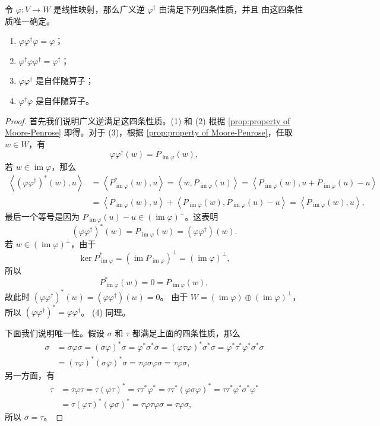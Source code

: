 \documentclass[fontset=none,zihao=-4]{Notes}
\DeclareMathOperator\im{im}
\newcommand{\inn}[1]{\left\langle#1\right\rangle}
\begin{document}
\begin{theorem}[广义逆的刻画]\label{thm:character of Moore-Penrose}
  令 $\varphi:V\to W$ 是线性映射，那么广义逆 $\varphi^\dagger$ 由满足下列四条性质，并且
  由这四条性质唯一确定。
  \begin{enumerate}
    \item $\varphi\varphi^\dagger\varphi=\varphi$；
    \item $\varphi^\dagger\varphi\varphi^\dagger=\varphi^\dagger$；
    \item $\varphi\varphi^\dagger$ 是自伴随算子；
    \item $\varphi^\dagger\varphi$ 是自伴随算子。
  \end{enumerate}
\end{theorem}
\begin{proof}
  首先我们说明广义逆满足这四条性质。(1) 和 (2) 根据 \autoref{prop:property of Moore-Penrose}
  即得。对于 (3)，根据 \autoref{prop:property of Moore-Penrose}，任取 $w\in W$，有
  \[
    \varphi\varphi^\dagger(w)=P_{\im\varphi}(w),  
  \]
  若 $w\in\im\varphi$，那么
  \begin{align*}
    \inn{(\varphi\varphi^\dagger)^*(w),u}&=\inn{P_{\im\varphi}^*(w),u}=\inn{w,P_{\im\varphi}(u)}
    =\inn{P_{\im\varphi}(w),u+P_{\im\varphi}(u)-u}\\
    &=\inn{P_{\im\varphi}(w),u}+\inn{P_{\im\varphi}(w),P_{\im\varphi}(u)-u}
    =\inn{P_{\im\varphi}(w),u},
  \end{align*}
  最后一个等号是因为 $P_{\im\varphi}(u)-u\in(\im\varphi)^\bot$。这表明
  \[
    (\varphi\varphi^\dagger)^*(w)=P_{\im\varphi}(w)=(\varphi\varphi^\dagger)(w).
  \]
  若 $w\in(\im\varphi)^\bot$，由于
  \[
    \ker P_{\im\varphi}^*=(\im P_{\im\varphi})^\bot=(\im\varphi)^\bot,  
  \]
  所以
  \[
    P_{\im\varphi}^*(w)=0=P_{\im\varphi}(w),  
  \]
  故此时 $(\varphi\varphi^\dagger)^*(w)=(\varphi\varphi^\dagger)(w)=0$。
  由于 $W=(\im\varphi)\oplus(\im\varphi)^\bot$，所以 $(\varphi\varphi^\dagger)^*=\varphi\varphi^\dagger$。
  (4) 同理。

  下面我们说明唯一性。假设 $\sigma$ 和 $\tau$ 都满足上面的四条性质，那么
  \begin{align*}
    \sigma&=\sigma\varphi\sigma=(\sigma\varphi)^*\sigma=\varphi^*\sigma^*\sigma
    =(\varphi\tau\varphi)^*\sigma^*\sigma=\varphi^*\tau^*\varphi^*\sigma^*\sigma\\
    &=(\tau\varphi)^*(\sigma\varphi)^*\sigma=\tau\varphi\sigma\varphi\sigma
    =\tau\varphi\sigma,
  \end{align*}
  另一方面，有
  \begin{align*}
    \tau&=\tau\varphi\tau=\tau(\varphi\tau)^*=\tau\tau^*\varphi^*=\tau\tau^*(\varphi\sigma\varphi)^*
    =\tau\tau^*\varphi^*\sigma^*\varphi^* \\
    &=\tau(\varphi\tau)^*(\varphi\sigma)^*=\tau\varphi\tau\varphi\sigma=\tau\varphi\sigma,
  \end{align*}
  所以 $\sigma=\tau$。
\end{proof}
\end{document}

